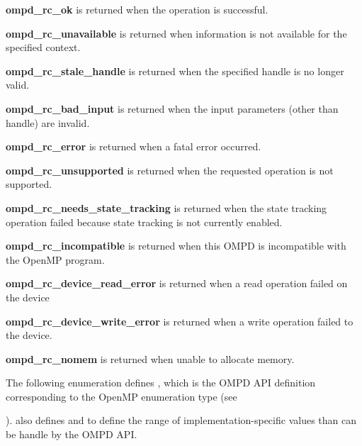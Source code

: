 \descr
\label{ompd:ompd_rc_ok}
\textbf{ompd\_rc\_ok} is returned when the operation is successful.

\label{ompd:ompd_rc_unavailable}
\textbf{ompd\_rc\_unavailable} is returned when 
information is not available for the specified context.

\label{ompd:ompd_rc_stale_handle}
\textbf{ompd\_rc\_stale\_handle} is returned when
the specified handle is no longer valid.

\label{ompd:ompd_rc_bad_input}
\textbf{ompd\_rc\_bad\_input} is returned when
the input parameters (other than handle) are invalid. 

\label{ompd:ompd_rc_error}
\textbf{ompd\_rc\_error} is returned when
a fatal error occurred.

\label{ompd:ompd_rc_unsupported}
\textbf{ompd\_rc\_unsupported} is returned when
the requested operation is not supported.

\label{ompd:ompd_rc_needs_state_tracking}
\textbf{ompd\_rc\_needs\_state\_tracking} is returned when
the state tracking operation failed because state tracking is not currently enabled.

\label{ompd:ompd_rc_incompatible}
\textbf{ompd\_rc\_incompatible} is returned when
this OMPD is incompatible with the OpenMP program.

\label{ompd:ompd_rc_device_read_error}
\textbf{ompd\_rc\_device\_read\_error} is returned when
a read operation failed on the device

\label{ompd:ompd_rc_device_write_error}
\textbf{ompd\_rc\_device\_write\_error} is returned when
a write operation failed to the device.

\label{ompd:ompd_rc_nomem}
\textbf{ompd\_rc\_nomem} is returned when
unable to allocate memory.

\label{ompd:ompd_sched_t}

The following enumeration defines , which is the OMPD API definition 
corresponding to the OpenMP enumeration type  (see 

).
 also defines  and
 to define the range of implementation-specific 
 values than can be handle by the OMPD API.

\begin{quote}
	\begin{lstlisting}

	\end{lstlisting}
\end{quote}

